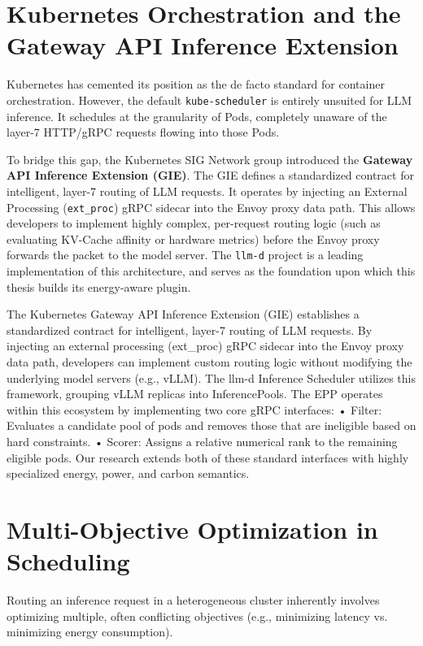 \documentclass[12pt,a4paper,oneside]{report}
\begin{document}
\section{Kubernetes Orchestration and the Gateway API Inference Extension}
\label{sec:lit_kubernetes}

Kubernetes has cemented its position as the de facto standard for container orchestration. However, the default \texttt{kube-scheduler} is entirely unsuited for LLM inference. It schedules at the granularity of Pods, completely unaware of the layer-7 HTTP/gRPC requests flowing into those Pods. 

To bridge this gap, the Kubernetes SIG Network group introduced the \textbf{Gateway API Inference Extension (GIE)}. The GIE defines a standardized contract for intelligent, layer-7 routing of LLM requests. It operates by injecting an External Processing (\texttt{ext\_proc}) gRPC sidecar into the Envoy proxy data path. This allows developers to implement highly complex, per-request routing logic (such as evaluating KV-Cache affinity or hardware metrics) before the Envoy proxy forwards the packet to the model server. The \texttt{llm-d} project is a leading implementation of this architecture, and serves as the foundation upon which this thesis builds its energy-aware plugin.


The Kubernetes Gateway API Inference Extension (GIE) establishes a standardized contract
for intelligent, layer-7 routing of LLM requests. By injecting an external processing
(ext_proc) gRPC sidecar into the Envoy proxy data path, developers can implement
custom routing logic without modifying the underlying model servers (e.g., vLLM).
The llm-d Inference Scheduler utilizes this framework, grouping vLLM replicas into
InferencePools. The EPP operates within this ecosystem by implementing two core
gRPC interfaces:
• Filter: Evaluates a candidate pool of pods and removes those that are ineligible
based on hard constraints.
• Scorer: Assigns a relative numerical rank to the remaining eligible pods.
Our research extends both of these standard interfaces with highly specialized energy,
power, and carbon semantics.

\section{Multi-Objective Optimization in Scheduling}
\label{sec:lit_optimization}

Routing an inference request in a heterogeneous cluster inherently involves optimizing multiple, often conflicting objectives (e.g., minimizing latency vs. minimizing energy consumption). 
\end{document}
